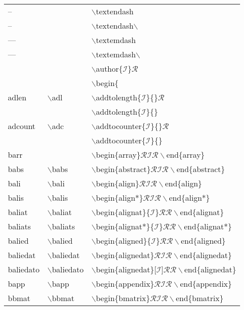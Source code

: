 \ttfamily
\begin{longtable}{p{20mm}p{20mm}p{65mm}}
-- &  & $\backslash$textendash\\
-- &  & $\backslash$textendash$\backslash$ \\
--- &  & $\backslash$textemdash\\
--- &  & $\backslash$textemdash$\backslash$ \\
 &  & $\backslash$author\{$\mathcal{I}$\}$\mathcal{R}$\\
 &  & $\backslash$begin\{\\
adlen & $\backslash$adl & $\backslash$addtolength\{$\mathcal{I}$\}\{\}$\mathcal{R}$\\
 &  & $\backslash$addtolength\{$\mathcal{I}$\}\{\}\\
adcount & $\backslash$adc & $\backslash$addtocounter\{$\mathcal{I}$\}\{\}$\mathcal{R}$\\
 &  & $\backslash$addtocounter\{$\mathcal{I}$\}\{\}\\
barr &  & $\backslash$begin\{array\}$\mathcal{RIR}\backslash$end\{array\}\\
babs & $\backslash$babs & $\backslash$begin\{abstract\}$\mathcal{RIR}\backslash$end\{abstract\}\\
bali & $\backslash$bali & $\backslash$begin\{align\}$\mathcal{RIR}\backslash$end\{align\}\\
balis & $\backslash$balis & $\backslash$begin\{align*\}$\mathcal{RIR}\backslash$end\{align*\}\\
baliat & $\backslash$baliat & $\backslash$begin\{alignat\}\{$\mathcal{I}$\}$\mathcal{RR}\backslash$end\{alignat\}\\
baliats & $\backslash$baliats & $\backslash$begin\{alignat*\}\{$\mathcal{I}$\}$\mathcal{RR}\backslash$end\{alignat*\}\\
balied & $\backslash$balied & $\backslash$begin\{aligned\}\{$\mathcal{I}$\}$\mathcal{RR}\backslash$end\{aligned\}\\
baliedat & $\backslash$baliedat & $\backslash$begin\{alignedat\}$\mathcal{RIR}\backslash$end\{alignedat\}\\
baliedato & $\backslash$baliedato & $\backslash$begin\{alignedat\}[$\mathcal{I}$]$\mathcal{RR}\backslash$end\{alignedat\}\\
bapp & $\backslash$bapp & $\backslash$begin\{appendix\}$\mathcal{RIR}\backslash$end\{appendix\}\\
bbmat & $\backslash$bbmat & $\backslash$begin\{bmatrix\}$\mathcal{RIR}\backslash$end\{bmatrix\}\\

\end{longtable}
